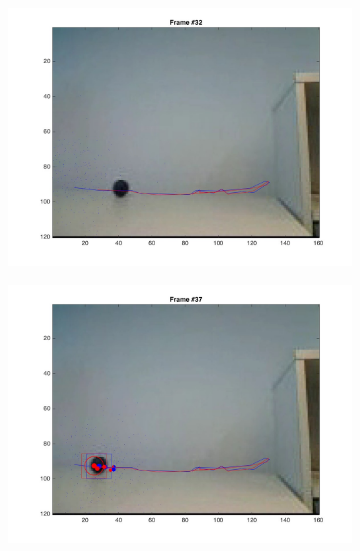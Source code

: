 \documentclass{ethz_report}
\begin{document}
\begin{figure}[h]
\begin{subfigure}[b]{.25\textwidth}
        \includegraphics[width=1\linewidth]{images/video3_observe_low_31}
    \end{subfigure}%
    \begin{subfigure}[b]{.25\textwidth}
        \centering
        \includegraphics[width=1\linewidth]{images/video3_observe_low_36}
    \end{subfigure}
    \begin{subfigure}[b]{.25\textwidth}
        \centering

\end{subfigure}
\end{figure}
\end{document}
